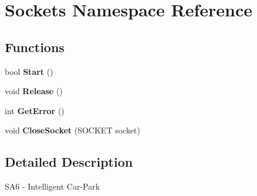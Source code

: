 \hypertarget{namespace_sockets}{}\section{Sockets Namespace Reference}
\label{namespace_sockets}
\subsection*{Functions}
\begin{DoxyCompactItemize}
\item 
\mbox{\label{namespace_sockets_abd487b24f7668b197a0b244273ec004f}} 
bool {\bfseries Start} ()
\item 
\mbox{\label{namespace_sockets_a92596c80f2c7e8918d9671750aaf9930}} 
void {\bfseries Release} ()
\item 
\mbox{\label{namespace_sockets_a637c6a293cb8a83bddfd037465d21b89}} 
int {\bfseries Get\+Error} ()
\item 
\mbox{\label{namespace_sockets_a07716654e6742f2a2dc74bb460c60dd4}} 
void {\bfseries Close\+Socket} (S\+O\+C\+K\+ET socket)
\end{DoxyCompactItemize}


\subsection{Detailed Description}
S\+A6 -\/ Intelligent Car-\/\+Park 